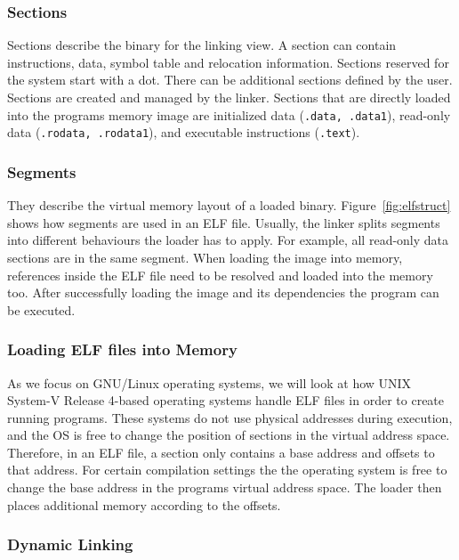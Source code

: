 \subsubsection{Sections}

Sections describe the binary for the linking view. A section can contain
instructions, data, symbol table and relocation information. Sections reserved
for the system start with a dot. There can be additional sections defined by
the user. Sections are created and managed by the linker. Sections that are
directly loaded into the program\textquotesingle s memory image are initialized
data (\texttt{.data, .data1}), read-only data (\texttt{.rodata, .rodata1}), and
executable instructions (\texttt{.text}).

\subsubsection{Segments}

They describe the virtual memory layout of a loaded binary.
Figure~\ref{fig:elfstruct} shows how segments are used in an ELF file.
Usually, the linker splits segments into different behaviours the loader has to
apply. For example, all read-only data sections are in the same segment. When
loading the image into memory, references inside the ELF file need to be
resolved and loaded into the memory too. After successfully loading the image
and its dependencies the program can be executed.

\subsubsection{Loading ELF files into Memory}

As we focus on GNU/Linux operating systems, we will look at how UNIX System-V
Release 4-based operating systems handle ELF files in order to create running
programs. These systems do not use physical addresses during execution, and
the OS is free to change the position of sections in the virtual address space.
Therefore, in an ELF file, a section only contains a base address and offsets
to that address. For certain compilation settings the the operating system is
free to change the base address in the programs virtual address space. The
loader then places additional memory according to the offsets.

\subsubsection{Dynamic Linking}

